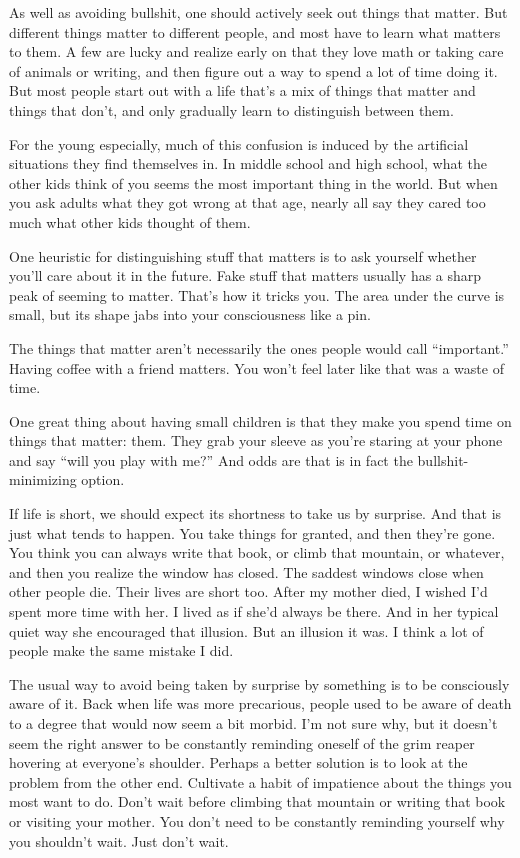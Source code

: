 As well as avoiding bullshit, one should actively seek out things that
matter. But different things matter to different people, and most have
to learn what matters to them. A few are lucky and realize early on that
they love math or taking care of animals or writing, and then figure out
a way to spend a lot of time doing it. But most people start out with a
life that's a mix of things that matter and things that don't, and only
gradually learn to distinguish between them.

For the young especially, much of this confusion is induced by the
artificial situations they find themselves in. In middle school and high
school, what the other kids think of you seems the most important thing
in the world. But when you ask adults what they got wrong at that age,
nearly all say they cared too much what other kids thought of them.

One heuristic for distinguishing stuff that matters is to ask yourself
whether you'll care about it in the future. Fake stuff that matters
usually has a sharp peak of seeming to matter. That's how it tricks you.
The area under the curve is small, but its shape jabs into your
consciousness like a pin.

The things that matter aren't necessarily the ones people would call
``important.'' Having coffee with a friend matters. You won't feel later
like that was a waste of time.

One great thing about having small children is that they make you spend
time on things that matter: them. They grab your sleeve as you're
staring at your phone and say ``will you play with me?'' And odds are
that is in fact the bullshit-minimizing option.

If life is short, we should expect its shortness to take us by surprise.
And that is just what tends to happen. You take things for granted, and
then they're gone. You think you can always write that book, or climb
that mountain, or whatever, and then you realize the window has closed.
The saddest windows close when other people die. Their lives are short
too. After my mother died, I wished I'd spent more time with her. I
lived as if she'd always be there. And in her typical quiet way she
encouraged that illusion. But an illusion it was. I think a lot of
people make the same mistake I did.

The usual way to avoid being taken by surprise by something is to be
consciously aware of it. Back when life was more precarious, people used
to be aware of death to a degree that would now seem a bit morbid. I'm
not sure why, but it doesn't seem the right answer to be constantly
reminding oneself of the grim reaper hovering at everyone's shoulder.
Perhaps a better solution is to look at the problem from the other end.
Cultivate a habit of impatience about the things you most want to do.
Don't wait before climbing that mountain or writing that book or
visiting your mother. You don't need to be constantly reminding yourself
why you shouldn't wait. Just don't wait.

